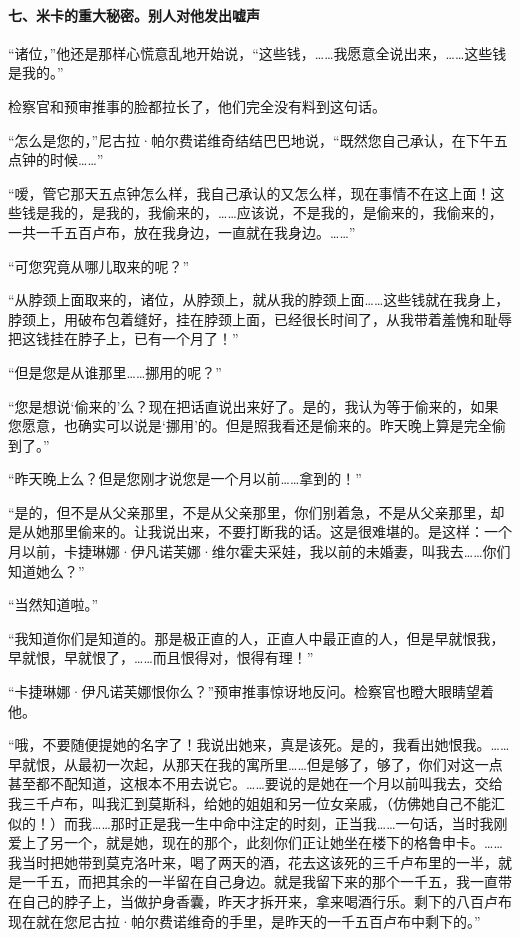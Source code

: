 \paragraph*{七、米卡的重大秘密。别人对他发出嘘声}
\par “诸位，”他还是那样心慌意乱地开始说，“这些钱，……我愿意全说出来，……这些钱是我的。”
\par 检察官和预审推事的脸都拉长了，他们完全没有料到这句话。
\par “怎么是您的，”尼古拉·帕尔费诺维奇结结巴巴地说，“既然您自己承认，在下午五点钟的时候……”
\par “嗳，管它那天五点钟怎么样，我自己承认的又怎么样，现在事情不在这上面！这些钱是我的，是我的，我偷来的，……应该说，不是我的，是偷来的，我偷来的，一共一千五百卢布，放在我身边，一直就在我身边。……”
\par “可您究竟从哪儿取来的呢？”
\par “从脖颈上面取来的，诸位，从脖颈上，就从我的脖颈上面……这些钱就在我身上，脖颈上，用破布包着缝好，挂在脖颈上面，已经很长时间了，从我带着羞愧和耻辱把这钱挂在脖子上，已有一个月了！”
\par “但是您是从谁那里……挪用的呢？”
\par “您是想说‘偷来的’么？现在把话直说出来好了。是的，我认为等于偷来的，如果您愿意，也确实可以说是‘挪用’的。但是照我看还是偷来的。昨天晚上算是完全偷到了。”
\par “昨天晚上么？但是您刚才说您是一个月以前……拿到的！”
\par “是的，但不是从父亲那里，不是从父亲那里，你们别着急，不是从父亲那里，却是从她那里偷来的。让我说出来，不要打断我的话。这是很难堪的。是这样：一个月以前，卡捷琳娜·伊凡诺芙娜·维尔霍夫采娃，我以前的未婚妻，叫我去……你们知道她么？”
\par “当然知道啦。”
\par “我知道你们是知道的。那是极正直的人，正直人中最正直的人，但是早就恨我，早就恨，早就恨了，……而且恨得对，恨得有理！”
\par “卡捷琳娜·伊凡诺芙娜恨你么？”预审推事惊讶地反问。检察官也瞪大眼睛望着他。
\par “哦，不要随便提她的名字了！我说出她来，真是该死。是的，我看出她恨我。……早就恨，从最初一次起，从那天在我的寓所里……但是够了，够了，你们对这一点甚至都不配知道，这根本不用去说它。……要说的是她在一个月以前叫我去，交给我三千卢布，叫我汇到莫斯科，给她的姐姐和另一位女亲戚，（仿佛她自己不能汇似的！）而我……那时正是我一生中命中注定的时刻，正当我……一句话，当时我刚爱上了另一个，就是她，现在的那个，此刻你们正让她坐在楼下的格鲁申卡。……我当时把她带到莫克洛叶来，喝了两天的酒，花去这该死的三千卢布里的一半，就是一千五，而把其余的一半留在自己身边。就是我留下来的那个一千五，我一直带在自己的脖子上，当做护身香囊，昨天才拆开来，拿来喝酒行乐。剩下的八百卢布现在就在您尼古拉·帕尔费诺维奇的手里，是昨天的一千五百卢布中剩下的。”
